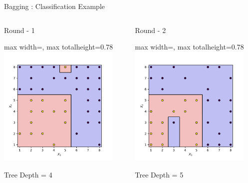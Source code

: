 \documentclass[10pt]{beamer}
\newcommand{\fitpic}[1]{\begin{adjustbox}{max width=\linewidth, max totalheight=0.78\textheight}#1\end{adjustbox}}
\begin{document}
\begin{frame}{Bagging : Classification Example}
  \vspace{0.3cm}
  \begin{columns}
    \pause  \begin{column}{0.3\textwidth}
      \centering
      Round - 1\\

      \fitpic{\includegraphics[width = 0.9\textwidth]{../assets/ensemble/figures/decision-boundary-0}}
      Tree Depth = 4

    \end{column}
    \pause  \begin{column}{0.3\textwidth}
      \centering
      Round - 2\\

      \fitpic{\includegraphics[width = 0.9\textwidth]{../assets/ensemble/figures/decision-boundary-1}}
      Tree Depth = 5


\end{column}
\end{columns}
\end{frame}
\end{document}
